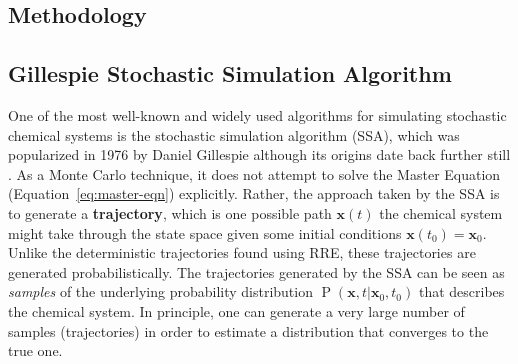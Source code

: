 \documentclass[english,letterpaper,12pt]{article}
\newcommand{\defkeywd}[1]{\textbf{#1}}
\renewcommand{\vec}[1]{\ensuremath{\mathbf{#1}}}
\DeclareMathOperator{\Prob}{P}
\begin{document}
\begin{doublespacing}


\section{Methodology} %
\label{sec:methodology}

\subsection{Gillespie Stochastic Simulation Algorithm} %
\label{sub:gillespie-ssa}

One of the most well-known and widely used  algorithms for simulating stochastic chemical systems is the stochastic simulation algorithm (SSA), which was popularized in 1976 by Daniel Gillespie although its origins date back further still . As a Monte Carlo technique, it does not attempt to solve the Master Equation (Equation~\eqref{eq:master-eqn}) explicitly. Rather, the approach taken by the SSA is to generate a \defkeywd{trajectory}, which is one possible path $\vec{x}(t)$ the chemical system might take through the state space given some initial conditions $\vec{x}(t_0) = \vec{x}_0$. Unlike the deterministic trajectories found using RRE, these trajectories are generated probabilistically. The trajectories generated by the SSA can be seen as \emph{samples} of the underlying probability distribution $\Prob(\vec{x}, t | \vec{x}_0, t_0)$ that describes the chemical system. In principle, one can generate a very large number of samples (trajectories) in order to estimate a distribution that converges to the true one.


\end{doublespacing}
\end{document}
